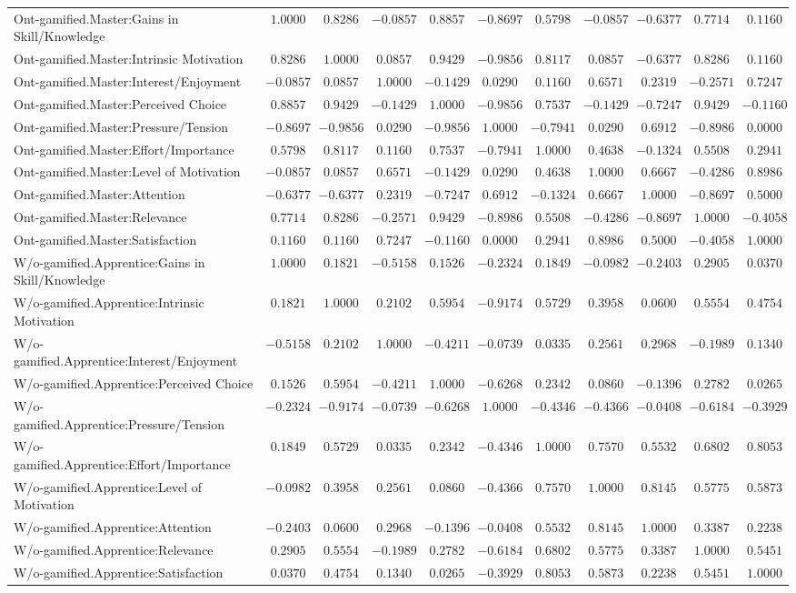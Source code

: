 \begin{landscape}
{\begin{longtable}{lrrrrrrrrrr}
Ont-gamified.Master:Gains in Skill/Knowledge&$ 1.0000$&$ 0.8286$&$-0.0857$&$ 0.8857$&$-0.8697$&$ 0.5798$&$-0.0857$&$-0.6377$&$ 0.7714$&$ 0.1160$\tabularnewline
Ont-gamified.Master:Intrinsic Motivation&$ 0.8286$&$ 1.0000$&$ 0.0857$&$ 0.9429$&$-0.9856$&$ 0.8117$&$ 0.0857$&$-0.6377$&$ 0.8286$&$ 0.1160$\tabularnewline
Ont-gamified.Master:Interest/Enjoyment&$-0.0857$&$ 0.0857$&$ 1.0000$&$-0.1429$&$ 0.0290$&$ 0.1160$&$ 0.6571$&$ 0.2319$&$-0.2571$&$ 0.7247$\tabularnewline
Ont-gamified.Master:Perceived Choice&$ 0.8857$&$ 0.9429$&$-0.1429$&$ 1.0000$&$-0.9856$&$ 0.7537$&$-0.1429$&$-0.7247$&$ 0.9429$&$-0.1160$\tabularnewline
Ont-gamified.Master:Pressure/Tension&$-0.8697$&$-0.9856$&$ 0.0290$&$-0.9856$&$ 1.0000$&$-0.7941$&$ 0.0290$&$ 0.6912$&$-0.8986$&$ 0.0000$\tabularnewline
Ont-gamified.Master:Effort/Importance&$ 0.5798$&$ 0.8117$&$ 0.1160$&$ 0.7537$&$-0.7941$&$ 1.0000$&$ 0.4638$&$-0.1324$&$ 0.5508$&$ 0.2941$\tabularnewline
Ont-gamified.Master:Level of Motivation&$-0.0857$&$ 0.0857$&$ 0.6571$&$-0.1429$&$ 0.0290$&$ 0.4638$&$ 1.0000$&$ 0.6667$&$-0.4286$&$ 0.8986$\tabularnewline
Ont-gamified.Master:Attention&$-0.6377$&$-0.6377$&$ 0.2319$&$-0.7247$&$ 0.6912$&$-0.1324$&$ 0.6667$&$ 1.0000$&$-0.8697$&$ 0.5000$\tabularnewline
Ont-gamified.Master:Relevance&$ 0.7714$&$ 0.8286$&$-0.2571$&$ 0.9429$&$-0.8986$&$ 0.5508$&$-0.4286$&$-0.8697$&$ 1.0000$&$-0.4058$\tabularnewline
Ont-gamified.Master:Satisfaction&$ 0.1160$&$ 0.1160$&$ 0.7247$&$-0.1160$&$ 0.0000$&$ 0.2941$&$ 0.8986$&$ 0.5000$&$-0.4058$&$ 1.0000$\tabularnewline
\hline



W/o-gamified.Apprentice:Gains in Skill/Knowledge&$ 1.0000$&$ 0.1821$&$-0.5158$&$ 0.1526$&$-0.2324$&$ 0.1849$&$-0.0982$&$-0.2403$&$ 0.2905$&$ 0.0370$\tabularnewline
W/o-gamified.Apprentice:Intrinsic Motivation&$ 0.1821$&$ 1.0000$&$ 0.2102$&$ 0.5954$&$-0.9174$&$ 0.5729$&$ 0.3958$&$ 0.0600$&$ 0.5554$&$ 0.4754$\tabularnewline
W/o-gamified.Apprentice:Interest/Enjoyment&$-0.5158$&$ 0.2102$&$ 1.0000$&$-0.4211$&$-0.0739$&$ 0.0335$&$ 0.2561$&$ 0.2968$&$-0.1989$&$ 0.1340$\tabularnewline
W/o-gamified.Apprentice:Perceived Choice&$ 0.1526$&$ 0.5954$&$-0.4211$&$ 1.0000$&$-0.6268$&$ 0.2342$&$ 0.0860$&$-0.1396$&$ 0.2782$&$ 0.0265$\tabularnewline
W/o-gamified.Apprentice:Pressure/Tension&$-0.2324$&$-0.9174$&$-0.0739$&$-0.6268$&$ 1.0000$&$-0.4346$&$-0.4366$&$-0.0408$&$-0.6184$&$-0.3929$\tabularnewline
W/o-gamified.Apprentice:Effort/Importance&$ 0.1849$&$ 0.5729$&$ 0.0335$&$ 0.2342$&$-0.4346$&$ 1.0000$&$ 0.7570$&$ 0.5532$&$ 0.6802$&$ 0.8053$\tabularnewline
W/o-gamified.Apprentice:Level of Motivation&$-0.0982$&$ 0.3958$&$ 0.2561$&$ 0.0860$&$-0.4366$&$ 0.7570$&$ 1.0000$&$ 0.8145$&$ 0.5775$&$ 0.5873$\tabularnewline
W/o-gamified.Apprentice:Attention&$-0.2403$&$ 0.0600$&$ 0.2968$&$-0.1396$&$-0.0408$&$ 0.5532$&$ 0.8145$&$ 1.0000$&$ 0.3387$&$ 0.2238$\tabularnewline
W/o-gamified.Apprentice:Relevance&$ 0.2905$&$ 0.5554$&$-0.1989$&$ 0.2782$&$-0.6184$&$ 0.6802$&$ 0.5775$&$ 0.3387$&$ 1.0000$&$ 0.5451$\tabularnewline
W/o-gamified.Apprentice:Satisfaction&$ 0.0370$&$ 0.4754$&$ 0.1340$&$ 0.0265$&$-0.3929$&$ 0.8053$&$ 0.5873$&$ 0.2238$&$ 0.5451$&$ 1.0000$\tabularnewline
\hline



\end{longtable}}
\end{landscape}

